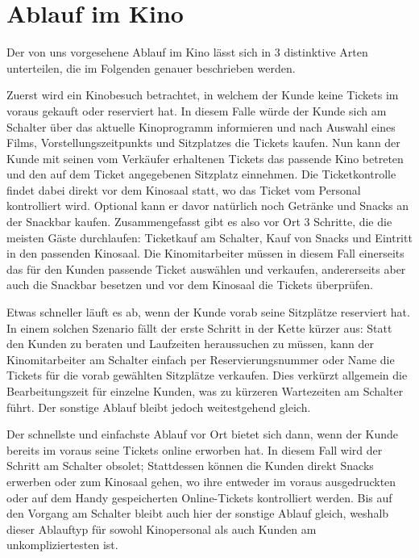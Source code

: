 \section{Ablauf im Kino}

Der von uns vorgesehene Ablauf im Kino lässt sich in 3 distinktive Arten unterteilen, die im Folgenden genauer beschrieben werden.


Zuerst wird ein Kinobesuch betrachtet, in welchem der Kunde keine Tickets im voraus gekauft oder reserviert hat. In diesem Falle würde der Kunde sich am Schalter über das aktuelle Kinoprogramm informieren und nach Auswahl eines Films, Vorstellungszeitpunkts und Sitzplatzes die Tickets kaufen. Nun kann der Kunde mit seinen vom Verkäufer erhaltenen Tickets das passende Kino betreten und den auf dem Ticket angegebenen Sitzplatz einnehmen. Die Ticketkontrolle findet dabei direkt vor dem Kinosaal statt, wo das Ticket vom Personal kontrolliert wird. Optional kann er davor natürlich noch Getränke und Snacks an der Snackbar kaufen. 
Zusammengefasst gibt es also vor Ort 3 Schritte, die die meisten Gäste durchlaufen: Ticketkauf am Schalter, Kauf von Snacks und Eintritt in den passenden Kinosaal.
Die Kinomitarbeiter müssen in diesem Fall einerseits das für den Kunden passende Ticket auswählen und verkaufen, andererseits aber auch die Snackbar besetzen und vor dem Kinosaal die Tickets überprüfen.


Etwas schneller läuft es ab, wenn der Kunde vorab seine Sitzplätze reserviert hat. In einem solchen Szenario fällt der erste Schritt in der Kette kürzer aus: Statt den Kunden zu beraten und Laufzeiten heraussuchen zu müssen, kann der Kinomitarbeiter am Schalter einfach per Reservierungsnummer oder Name die Tickets für die vorab gewählten Sitzplätze verkaufen. Dies verkürzt allgemein die Bearbeitungszeit für einzelne Kunden, was zu kürzeren Wartezeiten am Schalter führt. Der sonstige Ablauf bleibt jedoch weitestgehend gleich.


Der schnellste und einfachste Ablauf vor Ort bietet sich dann, wenn der Kunde bereits im voraus seine Tickets online erworben hat. In diesem Fall wird der Schritt am Schalter obsolet; Stattdessen können die Kunden direkt Snacks erwerben oder zum Kinosaal gehen, wo ihre entweder im voraus ausgedruckten oder auf dem Handy gespeicherten Online-Tickets kontrolliert werden. Bis auf den Vorgang am Schalter bleibt auch hier der sonstige Ablauf gleich, weshalb dieser Ablauftyp für sowohl Kinopersonal als auch Kunden am unkompliziertesten ist.